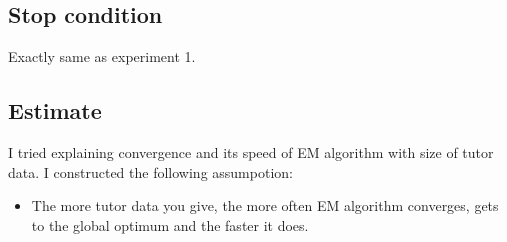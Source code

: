 \documentclass[uplatex]{jsarticle}
\begin{document}
    \subsection{Stop condition}
      \indent
	Exactly same as experiment 1.
      \par
    \subsection{Estimate}
      \indent
	I tried explaining convergence and its speed of EM algorithm with size of tutor data. I constructed the following assumpotion:
      \par
      \indent
	\begin{shadebox}
	  \begin{itemize}
	    \item The more tutor data you give, the more often EM algorithm converges, gets to the global optimum and the faster it does.
	  \end{itemize}
	\end{shadebox}
      \par
\end{document}
